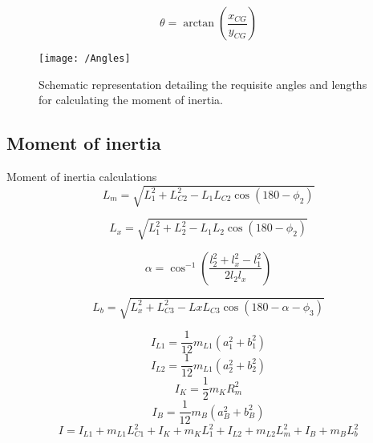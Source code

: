 \begin{itemize}
	\begin{equation}
		\theta = \arctan\left(\frac{{x_{CG}}}{{y_{CG}}}\right)
	\end{equation}
	
	
	\begin{figure}[h]
		\centering
		\texttt{[image: /Angles]}
		\caption[Moment of inertia Schematic representation]{Schematic representation detailing the requisite angles and lengths for calculating the moment of inertia.}
		\label{fig:Schematic representation detailing the requisite angles and lengths for calculating the moment of inertia.}
	\end{figure}
	
	\subsection{Moment of inertia}
	Moment of inertia calculations 
	\begin{equation}
		L_m = \sqrt{L_1^2 + L_{C2}^2 - L_1 L_{C2} \cos(180 - \phi_2)}
	\end{equation}
	
	\begin{equation}
		L_{x} = \sqrt{L_1^2 + L_2^2 - L_1 L_2 \cos(180 - \phi_2)}
	\end{equation}
	
	
	\begin{equation}
		\alpha = \cos^{-1} \left( \frac{l_2^2 + l_{x}^2 - l_1^2}{2 l_2 l_{x}} \right) 
	\end{equation}
	
	
	\begin{equation}
		L_b = \sqrt{L_{x}^2 + L_{C3}^2 - Lx L_{C3} \cos(180 - \alpha - \phi_3 )}
	\end{equation}
	
	\begin{equation}
		I_{L1} = \frac{1}{12} m_{L1} (a_1^2 + b_1^2)
	\end{equation}
	\begin{equation}
		I_{L2} = \frac{1}{12} m_{L1} (a_2^2 + b_2^2)
	\end{equation}
	\begin{equation}
		I_K = \frac{1}{2} m_K R_m^2
	\end{equation}
	\begin{equation}
		I_B = \frac{1}{12} m_B (a_B^2 + b_B^2)
	\end{equation}
	\begin{equation}
		I = I_{L1} + m_{L1} L_{C1}^2 + I_K + m_K L_1^2 + I_{L2} + m_{L2} L_m^2 + I_B + m_B L_b^2
	\end{equation}
	

\end{itemize}
